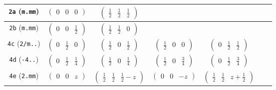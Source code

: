 \documentclass[fleqn,9pt,landscape]{jsarticle}
\begin{document}
\begin{center}
\begin{longtable}{ccccccc}
{\tt 2a} ({\tt m.mm}) & $ \begin{pmatrix} 0 & 0 & 0 \end{pmatrix} $ & $ \begin{pmatrix} \frac{1}{2} & \frac{1}{2} & \frac{1}{2} \end{pmatrix} $ & $  $ & $  $ & $  $ & $  $ \\ \hline
{\tt 2b} ({\tt m.mm}) & $ \begin{pmatrix} 0 & 0 & \frac{1}{2} \end{pmatrix} $ & $ \begin{pmatrix} \frac{1}{2} & \frac{1}{2} & 0 \end{pmatrix} $ & $  $ & $  $ & $  $ & $  $ \\ \hline
{\tt 4c} ({\tt 2/m..}) & $ \begin{pmatrix} 0 & \frac{1}{2} & 0 \end{pmatrix} $ & $ \begin{pmatrix} \frac{1}{2} & 0 & \frac{1}{2} \end{pmatrix} $ & $ \begin{pmatrix} \frac{1}{2} & 0 & 0 \end{pmatrix} $ & $ \begin{pmatrix} 0 & \frac{1}{2} & \frac{1}{2} \end{pmatrix} $ & $  $ & $  $ \\ \hline
{\tt 4d} ({\tt -4..}) & $ \begin{pmatrix} 0 & \frac{1}{2} & \frac{1}{4} \end{pmatrix} $ & $ \begin{pmatrix} \frac{1}{2} & 0 & \frac{1}{4} \end{pmatrix} $ & $ \begin{pmatrix} \frac{1}{2} & 0 & \frac{3}{4} \end{pmatrix} $ & $ \begin{pmatrix} 0 & \frac{1}{2} & \frac{3}{4} \end{pmatrix} $ & $  $ & $  $ \\ \hline
{\tt 4e} ({\tt 2.mm}) & $ \begin{pmatrix} 0 & 0 & z \end{pmatrix} $ & $ \begin{pmatrix} \frac{1}{2} & \frac{1}{2} & \frac{1}{2} - z \end{pmatrix} $ & $ \begin{pmatrix} 0 & 0 & - z \end{pmatrix} $ & $ \begin{pmatrix} \frac{1}{2} & \frac{1}{2} & z + \frac{1}{2} \end{pmatrix} $ & $  $ & $  $ \\ \hline

\end{longtable}
\end{center}
\end{document}
